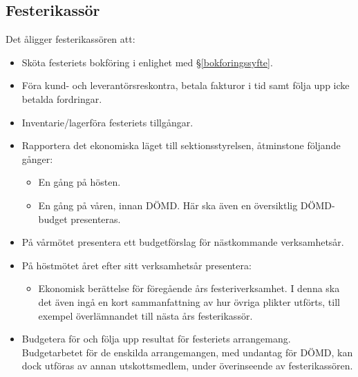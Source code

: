 \documentclass{datateknologsektionen-document}
\begin{document}
\subsection{Festerikassör}
\label{festerikassor}
Det åligger festerikassören att:
\begin{itemize}
  \item Sköta festeriets bokföring i enlighet med \S \ref{bokforingssyfte}.
  \item Föra kund- och leverantörsreskontra, betala fakturor i tid samt följa upp icke betalda fordringar.
  \item Inventarie/lagerföra festeriets tillgångar.
  \item Rapportera det ekonomiska läget till sektionsstyrelsen, åtminstone följande gånger:
        \begin{itemize}
          \item En gång på hösten.
          \item En gång på våren, innan DÖMD. Här ska även en översiktlig DÖMD-budget presenteras.
        \end{itemize}
  \item På vårmötet presentera ett budgetförslag för nästkommande verksamhetsår.
  \item På höstmötet året efter sitt verksamhetsår presentera:
        \begin{itemize}
          \item Ekonomisk berättelse för föregående års festeriverksamhet. I denna ska det även ingå en kort sammanfattning av hur övriga plikter utförts, till exempel överlämnandet till nästa års festerikassör.
        \end{itemize}
  \item Budgetera för och följa upp resultat för festeriets arrangemang. Budgetarbetet för de enskilda arrangemangen, med undantag för DÖMD, kan dock utföras av annan utskottsmedlem, under överinseende av festerikassören.
\end{itemize}
\end{document}
